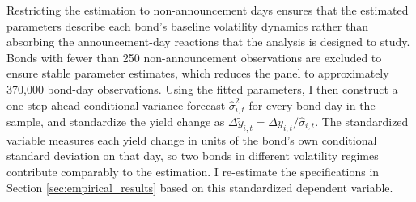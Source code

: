 \documentclass[english, 11pt, oneside]{article}
\begin{document}
Restricting the estimation to non-announcement days ensures that the estimated parameters describe each bond's baseline volatility dynamics rather than absorbing the announcement-day reactions that the analysis is designed to study. Bonds with fewer than 250 non-announcement observations are excluded to ensure stable parameter estimates, which reduces the panel to approximately 370,000 bond-day observations. Using the fitted parameters, I then construct a one-step-ahead conditional variance forecast $\hat{\sigma}^2_{i,t}$ for every bond-day in the sample, and standardize the yield change as $\Delta \tilde{y}_{i,t} = \Delta y_{i,t} / \hat{\sigma}_{i,t}$. The standardized variable measures each yield change in units of the bond's own conditional standard deviation on that day, so two bonds in different volatility regimes contribute comparably to the estimation. I re-estimate the specifications in Section \ref{sec:empirical_results} based on this standardized dependent variable.
\end{document}
